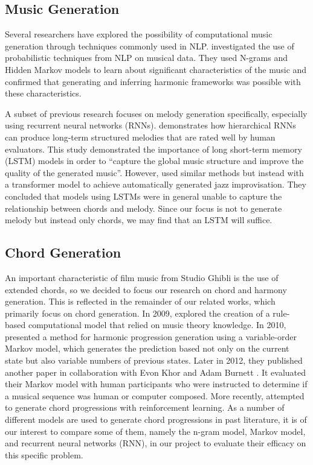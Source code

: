 \documentclass[11pt,a4paper]{article}
\begin{document}
\subsection{Music Generation}
Several researchers have explored the possibility of computational music generation through techniques commonly used in NLP. \citet{ponsford1999} investigated the use of probabilistic techniques from NLP on musical data. They used N-grams and Hidden Markov models to learn about significant characteristics of the music and confirmed that generating and inferring harmonic frameworks was possible with these characteristics. 

A subset of previous research focuses on melody generation specifically, especially using recurrent neural networks (RNNs). \citet{wu2019} demonstrates how hierarchical RNNs can produce long-term structured melodies that are rated well by human evaluators. This study demonstrated the importance of long short-term memory (LSTM) models in order to “capture the global music structure and improve the quality of the generated music”. However, \citet{madaghiele2021} used similar methods but instead with a transformer model to achieve automatically generated jazz improvisation. They concluded that models using LSTMs were in general unable to capture the relationship between chords and melody. Since our focus is not to generate melody but instead only chords, we may find that an LSTM will suffice. 

\subsection{Chord Generation}
An important characteristic of film music from Studio Ghibli is the use of extended chords, so we decided to focus our research on chord and harmony generation. This is reflected in the remainder of our related works, which primarily focus on chord generation. In 2009, \citet{anders2009} explored the creation of a rule-based computational model that relied on music theory knowledge. In 2010, \citet{eigenfeldt2010} presented a method for harmonic progression generation using a variable-order Markov model, which generates the prediction based not only on the current state but also variable numbers of previous states. Later in 2012, they published another paper in collaboration with Evon Khor and Adam Burnett \citep{burnett2012}. It evaluated their Markov model with human participants who were instructed to determine if a musical sequence was human or computer composed. More recently, \citet{shukla2018} attempted to generate chord progressions with reinforcement learning. As a number of different models are used to generate chord progressions in past literature, it is of our interest to compare some of them, namely the n-gram model, Markov model, and recurrent neural networks (RNN), in our project to evaluate their efficacy on this specific problem. 
\end{document}
